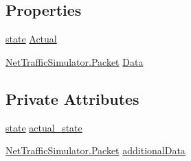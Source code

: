 \subsection*{Properties}
\begin{DoxyCompactItemize}
\item 
\hyperlink{classMFF__NPRG031_1_1State_a66bf64f065cb036d2652b0f69b0c5e10}{state} \hyperlink{classMFF__NPRG031_1_1State_ae40dbb14621157094cf06a2ea15dfd16}{Actual}
\item 
\hyperlink{classNetTrafficSimulator_1_1Packet}{Net\-Traffic\-Simulator.\-Packet} \hyperlink{classMFF__NPRG031_1_1State_ae055415ebd4348d92d3c30dbbb97db3e}{Data}
\end{DoxyCompactItemize}
\subsection*{Private Attributes}
\begin{DoxyCompactItemize}
\item 
\hyperlink{classMFF__NPRG031_1_1State_a66bf64f065cb036d2652b0f69b0c5e10}{state} \hyperlink{classMFF__NPRG031_1_1State_a5f45eababa042d4080090acaee40283f}{actual\-\_\-state}
\item 
\hyperlink{classNetTrafficSimulator_1_1Packet}{Net\-Traffic\-Simulator.\-Packet} \hyperlink{classMFF__NPRG031_1_1State_ac639d434c61a43dfb0792d31b315255c}{additional\-Data}
\end{DoxyCompactItemize}


